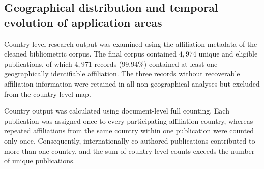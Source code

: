\documentclass[pdflatex,sn-mathphys-num]{sn-jnl}%
\theoremstyle{thmstyleone}%
\theoremstyle{thmstyletwo}%
\theoremstyle{thmstylethree}%
\begin{document}



\subsection{Geographical distribution and temporal evolution of application areas}
\label{subsec:geographical-application-evolution}

Country-level research output was examined using the affiliation metadata of the
cleaned bibliometric corpus. The final corpus contained \(4{,}974\) unique and
eligible publications, of which \(4{,}971\) records (\(99.94\%\)) contained at
least one geographically identifiable affiliation. The three records without
recoverable affiliation information were retained in all non-geographical
analyses but excluded from the country-level map.

Country output was calculated using document-level full counting. Each
publication was assigned once to every participating affiliation country,
whereas repeated affiliations from the same country within one publication
were counted only once. Consequently, internationally co-authored publications
contributed to more than one country, and the sum of country-level counts
exceeds the number of unique publications.
\end{document}
